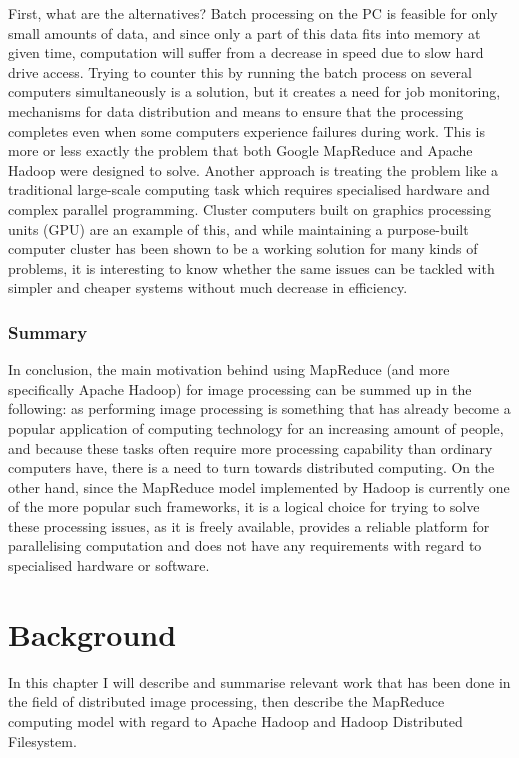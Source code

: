 \documentclass [12pt,a4paper]{report}
\begin{document}
First, what are the alternatives? Batch processing on the PC is feasible for only small amounts of data, and since only a part of this data fits into memory at given time, computation will suffer from a decrease in speed due to slow hard drive access. Trying to counter this by running the batch process on several computers simultaneously is a solution, but it creates a need for job monitoring, mechanisms for data distribution and means to ensure that the processing completes even when some computers experience failures during work. This is more or less exactly the problem that both Google MapReduce and Apache Hadoop were designed to solve. Another approach is treating the problem like a traditional large-scale computing task which requires specialised hardware and complex parallel programming. Cluster computers built on graphics processing units (GPU) are an example of this, and while maintaining a purpose-built computer cluster has been shown to be a working solution for many kinds of problems, it is interesting to know whether the same issues can be tackled with simpler and cheaper systems without much decrease in efficiency.

\subsection{Summary}

In conclusion, the main motivation behind using MapReduce (and more specifically Apache Hadoop) for image processing can be summed up in the following: as performing image processing is something that has already become a popular application of computing technology for an increasing amount of people, and because these tasks often require more processing capability than ordinary computers have, there is a need to turn towards distributed computing. On the other hand, since the MapReduce model implemented by Hadoop is currently one of the more popular such frameworks, it is a logical choice for trying to solve these processing issues, as it is freely available, provides a reliable platform for parallelising computation and does not have any requirements with regard to specialised hardware or software.

\chapter{Background}

In this chapter I will describe and summarise relevant work that has been done in the field of distributed image processing, then describe the MapReduce computing model with regard to Apache Hadoop and Hadoop Distributed Filesystem.
\end{document}
